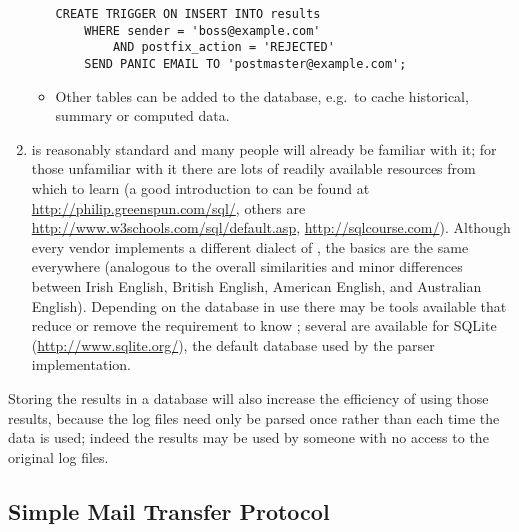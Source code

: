 \begin{enumerate}
\begin{itemize}
\begin{verbatim}
CREATE TRIGGER ON INSERT INTO results
    WHERE sender = 'boss@example.com'
        AND postfix_action = 'REJECTED'
    SEND PANIC EMAIL TO 'postmaster@example.com';
\end{verbatim}

            \item Other tables can be added to the database, e.g.\ to cache
                historical, summary or computed data.

        \end{itemize}


    \item \SQL{} is reasonably standard and many people will already be
        familiar with it; for those unfamiliar with it there are lots of
        readily available resources from which to learn (a good
        introduction to \SQL{} can be found at
        \url{http://philip.greenspun.com/sql/},
        others are \url{http://www.w3schools.com/sql/default.asp},
        \url{http://sqlcourse.com/}).  Although
        every vendor implements a different dialect of \SQL{}, the basics
        are the same everywhere (analogous to the overall similarities and
        minor differences between Irish English, British English, American
        English, and Australian English).  Depending on the database in use
        there may be tools available that reduce or remove the requirement
        to know \SQL{}; several are available for SQLite
        (\url{http://www.sqlite.org/}), the default database used by the
        parser implementation.

\end{enumerate}

Storing the results in a database will also increase the efficiency of
using those results, because the log files need only be parsed once rather
than each time the data is used; indeed the results may be used by someone
with no access to the original log files.



\subsection{Simple Mail Transfer Protocol}

\label{SMTP background}

